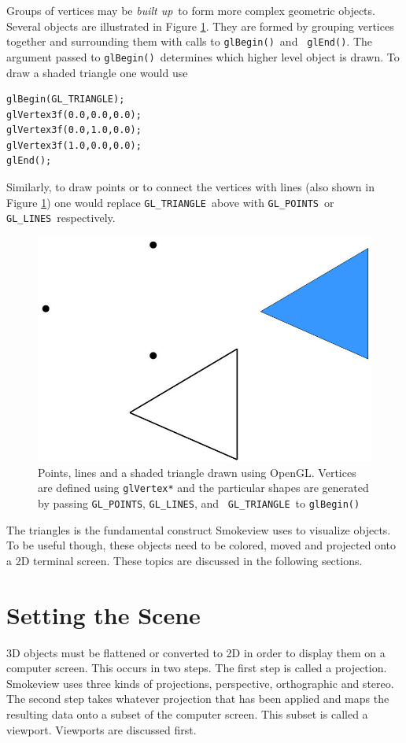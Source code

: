 \documentclass[11pt,twoside]{book}
\begin{document}
Groups of vertices may be {\em built up}\ to form more complex geometric objects.
Several objects are illustrated in Figure \ref{figshapes}.  They are formed by grouping vertices together
and surrounding them with calls to {\tt glBegin()}\ and {\tt
glEnd()}. The argument passed to {\tt glBegin()}\ determines which higher level object is drawn.
To draw a shaded triangle one would use
\begin{verbatim}
glBegin(GL_TRIANGLE);
glVertex3f(0.0,0.0,0.0);
glVertex3f(0.0,1.0,0.0);
glVertex3f(1.0,0.0,0.0);
glEnd();
\end{verbatim}
Similarly, to draw points or to connect the vertices with lines (also shown
in Figure \ref{figshapes}) one would replace {\tt GL\_TRIANGLE}\ above 
with {\tt GL\_POINTS}\ or {\tt GL\_LINES}\ respectively.
\begin{figure}[t]
\begin{center}
\includegraphics[width=6.0in]{figures/shapes}
\end{center}
\caption[Points, lines and a shaded triangle drawn using OpenGL.]
{Points, lines and a shaded triangle drawn using OpenGL. Vertices
are defined using {\tt glVertex*} and the particular shapes are
generated by passing {\tt GL\_POINTS}, {\tt GL\_LINES}, and {\tt
GL\_TRIANGLE}\ to {\tt glBegin()} } \label{figshapes}
\end{figure}

The triangles is the fundamental construct Smokeview uses to
visualize objects.  To be useful though, these objects need to be
colored, moved and projected onto a 2D terminal screen. These
topics are discussed in the following sections.

\chapter{Setting the Scene}
3D objects must be flattened or converted to 2D in order to display them on a computer screen.  This occurs in two steps.  The first step is called a projection.  Smokeview uses three kinds of projections, perspective, orthographic and stereo.  The second step takes whatever projection that has been applied and maps the resulting data onto a subset of the computer screen.  This subset is called a viewport.  Viewports are discussed first.
\end{document}
